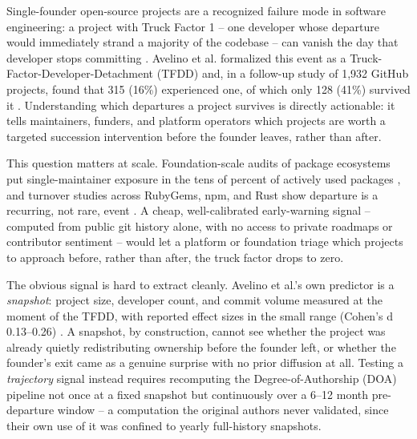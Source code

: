 \documentclass[11pt,letterpaper]{article}
\begin{document}
Single-founder open-source projects are a recognized failure mode in software engineering: a project with Truck Factor 1 -- one developer whose departure would immediately strand a majority of the codebase -- can vanish the day that developer stops committing \citep{Avelino2016}. Avelino et al. formalized this event as a Truck-Factor-Developer-Detachment (TFDD) and, in a follow-up study of 1,932 GitHub projects, found that 315 (16\%) experienced one, of which only 128 (41\%) survived it \citep{Avelino2019}. Understanding which departures a project survives is directly actionable: it tells maintainers, funders, and platform operators which projects are worth a targeted succession intervention before the founder leaves, rather than after.

This question matters at scale. Foundation-scale audits of package ecosystems put single-maintainer exposure in the tens of percent of actively used packages \citep{Jabrayilzade2022, Coelho2017}, and turnover studies across RubyGems, npm, and Rust show departure is a recurring, not rare, event \citep{Constantinou2017, Fan2025}. A cheap, well-calibrated early-warning signal -- computed from public git history alone, with no access to private roadmaps or contributor sentiment -- would let a platform or foundation triage which projects to approach before, rather than after, the truck factor drops to zero.

The obvious signal is hard to extract cleanly. Avelino et al.'s own predictor is a \emph{snapshot}: project size, developer count, and commit volume measured at the moment of the TFDD, with reported effect sizes in the small range (Cohen's d 0.13--0.26) \citep{Avelino2019}. A snapshot, by construction, cannot see whether the project was already quietly redistributing ownership before the founder left, or whether the founder's exit came as a genuine surprise with no prior diffusion at all. Testing a \emph{trajectory} signal instead requires recomputing the Degree-of-Authorship (DOA) pipeline not once at a fixed snapshot but continuously over a 6--12 month pre-departure window -- a computation the original authors never validated, since their own use of it was confined to yearly full-history snapshots.
\end{document}
